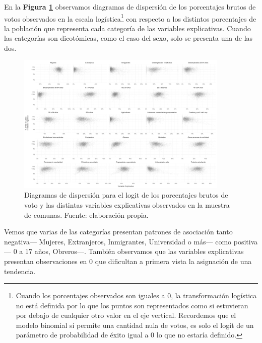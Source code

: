 En la \textbf{Figura \ref{fig:Disper_Voto_Variables}} observamos diagramas de dispersión de los porcentajes brutos de votos observados en la escala logística\footnote{Cuando los porcentajes observados son iguales a 0, la transformación logística no está definida por lo que los puntos son representados como si estuvieran por debajo de cualquier otro valor en el eje vertical. Recordemos que el modelo binomial sí permite una cantidad nula de votos, es solo el logit de un parámetro de probabilidad de éxito igual a 0 lo que no estaría definido.} con respecto a los distintos porcentajes de la población que representa cada categoría de las variables explicativas. Cuando las categorías son dicotómicas, como el caso del sexo, solo se presenta una de las dos.\\ 

\begin{figure}
	\centering
	\includegraphics[width = 0.9\textwidth]{Figs/AED/Asociaciones_MUESTRA}
	\caption{Diagramas de dispersión para el logit de los porcentajes brutos de voto y las distintas variables explicativas observados en la muestra de comunas. Fuente: elaboración propia.}
	\label{fig:Disper_Voto_Variables}	
\end{figure}

Vemos que varias de las categorías presentan patrones de asociación tanto negativa--- Mujeres, Extranjeros, Inmigrantes, Universidad o más--- como positiva--- 0 a 17 años, Obreros---. También observamos que las variables explicativas presentan observaciones en 0 que dificultan a primera vista la asignación de una tendencia.\\

